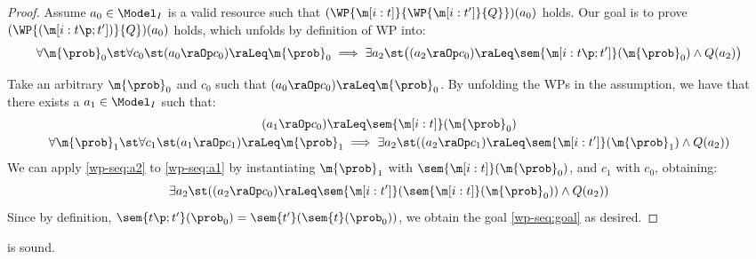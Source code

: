 \documentclass[acmsmall,nonacm,screen,appendix]{acmart}
\begin{document}
\begin{proof}
Assume $a_0 \in \Model_I$ is a valid resource such that
  $(\WP {\m[i: t]} {\WP {\m[i: t']} {Q}})(a_0)$ holds.
  Our goal is to prove $(\WP {(\m[i: t\p; t'])} {Q})(a_0)$ holds,
  which unfolds by definition of WP into:
  \begin{equation}
    \forall \m{\prob}_0\st
    \forall c_0 \st
    (a_0 \raOp c_0) \raLeq \m{\prob}_0
    \implies
      \exists a_2 \st
      \bigl(
      (a_2 \raOp c_0) \raLeq \sem{\m[i: t\p; t']}(\m{\prob}_0)
      \land Q(a_2)
      \bigr)
    \label{wp-seq:goal}
  \end{equation}

  Take an arbitrary $\m{\prob}_0$ and $c_0$ such that
  $ (a_0 \raOp c_0) \raLeq \m{\prob}_0 $.
  By unfolding the WPs in the assumption,
  we have that there exists a
  $a_1 \in \Model_I$ such that:
  \begin{gather}
    (a_1 \raOp c_0) \raLeq \sem{\m[i: t]}(\m{\prob}_0)
    \label{wp-seq:a1}
    \\
    \forall \m{\prob}_1\st
    \forall c_1 \st
      (a_1 \raOp c_1) \raLeq \m{\prob}_1
      \implies
      \exists a_2 \st
      ((a_2 \raOp c_1) \raLeq \sem{\m[i: t']}(\m{\prob}_1)
      \land  Q(a_2))
    \label{wp-seq:a2}
  \end{gather}
  We can apply \eqref{wp-seq:a2} to \eqref{wp-seq:a1}
  by instantiating $\m{\prob}_1$ with $\sem{\m[i: t]}(\m{\prob}_0)$,
  and $c_1$ with $c_0$,
  obtaining:
  \[
    \exists a_2 \st
    ((a_2 \raOp c_0) \raLeq \sem{\m[i: t']}(\sem{\m[i: t]}(\m{\prob}_0))
    \land  Q(a_2))
  \]
  Since by definition,
  $ \sem{t\p; t'}(\prob_0) = \sem{t'}(\sem{t}(\prob_0)) $,
  we obtain the goal \eqref{wp-seq:goal} as desired.
\end{proof} \begin{lemma}
\label{proof:wp-assign}
   is sound.
\end{lemma}
\end{document}
